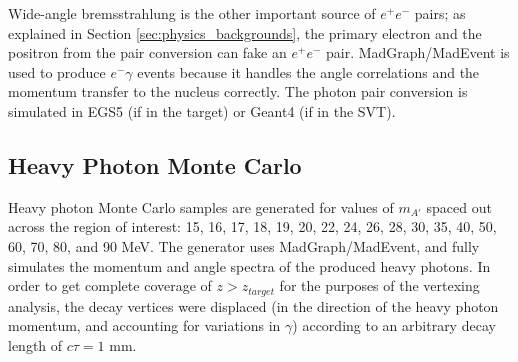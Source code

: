 Wide-angle bremsstrahlung is the other important source of $e^+e^-$ pairs; as explained in Section \ref{sec:physics_backgrounds}, the primary electron and the positron from the pair conversion can fake an $e^+e^-$ pair.
MadGraph/MadEvent is used to produce $e^-\gamma$ events because it handles the angle correlations and the momentum transfer to the nucleus correctly.
The photon pair conversion is simulated in EGS5 (if in the target) or Geant4 (if in the SVT).

\subsection{Heavy Photon Monte Carlo}
\label{sec:ap_mc}
Heavy photon Monte Carlo samples are generated for values of $m_{A'}$ spaced out across the region of interest: 15, 16, 17, 18, 19, 20, 22, 24, 26, 28, 30, 35, 40, 50, 60, 70, 80, and 90 MeV.
The generator uses MadGraph/MadEvent, and fully simulates the momentum and angle spectra of the produced heavy photons.
In order to get complete coverage of $z>z_{target}$ for the purposes of the vertexing analysis, the decay vertices were displaced (in the direction of the heavy photon momentum, and accounting for variations in $\gamma$) according to an arbitrary decay length of $c\tau=1$ mm.

\clearpage
